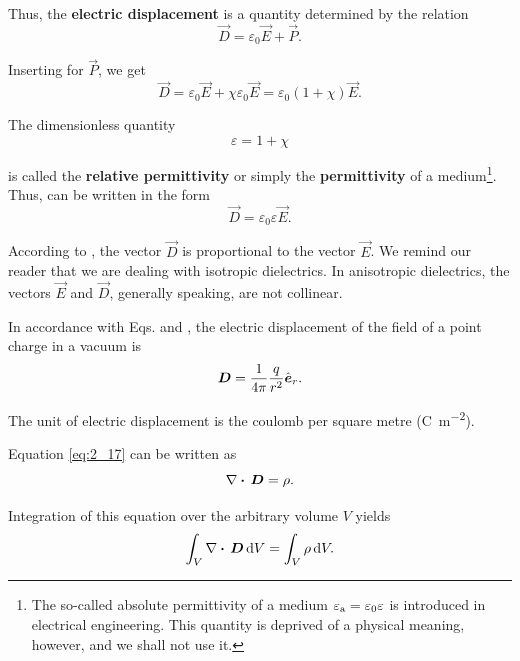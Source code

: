 Thus, the \textbf{electric displacement} is a quantity determined by the relation
\begin{equation}\label{eq:2_18}
    \vec{D} = \varepsilon_0\vec{E} + \vec{P}.
\end{equation}

\noindent
Inserting  for $\vec{P}$, we get
\begin{equation}\label{eq:2_19}
    \vec{D} = \varepsilon_0\vec{E} + \chi\varepsilon_0\vec{E} = \varepsilon_0 (1+\chi) \vec{E}.
\end{equation}

The dimensionless quantity
\begin{equation}\label{eq:2_20}
    \varepsilon = 1 + \chi
\end{equation}

\noindent
is called the \textbf{relative permittivity} or simply the \textbf{permittivity} of a medium\footnote{The so-called absolute permittivity of a medium $\varepsilon_{\text{a}}=\varepsilon_0\varepsilon$ is introduced in electrical engineering. This quantity is deprived of a physical meaning, however, and we shall not use it.}. Thus,  can be written in the form
\begin{equation}\label{eq:2_21}
    \vec{D} = \varepsilon_0 \varepsilon \vec{E}.
\end{equation}

\noindent
According to , the vector $\vec{D}$ is proportional to the vector $\vec{E}$. We remind our reader that we are dealing with isotropic dielectrics. In anisotropic dielectrics, the vectors $\vec{E}$ and $\vec{D}$, generally speaking, are not collinear.

In accordance with Eqs.  and , the electric displacement of the field of a point charge in a vacuum is
\begin{equation}\label{eq:2_22}
    \boldsymbol{D} = \frac{1}{4\pi} \frac{q}{r^2} \hat{\boldsymbol{e}}_{r}.
\end{equation}

The unit of electric displacement is the coulomb per square
metre (\si{\coulomb\per\metre\squared}).

Equation \eqref{eq:2_17} can be written as
\begin{equation}\label{eq:2_23}
    \nabla\boldsymbol{\cdot}\,\boldsymbol{D} = \rho.
\end{equation}

\noindent
Integration of this equation over the arbitrary volume $V$ yields
\begin{equation*}
    \int_V \nabla\boldsymbol{\cdot}\,\boldsymbol{D}\, \mathrm{d} V = \int_V \rho\, \mathrm{d} V.
\end{equation*}

